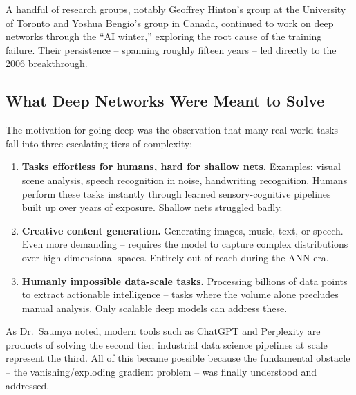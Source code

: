 \documentclass[12pt,a4paper]{article}
\begin{document}
\begin{keyinsight}
A handful of research groups, notably Geoffrey Hinton's group at the
University of Toronto and Yoshua Bengio's group in Canada, continued to
work on deep networks through the ``AI winter,'' exploring the root
cause of the training failure.  Their persistence -- spanning roughly
fifteen years -- led directly to the 2006 breakthrough.
\end{keyinsight}

\subsection{What Deep Networks Were Meant to Solve}
\label{subsec:capabilities}

The motivation for going deep was the observation that many real-world
tasks fall into three escalating tiers of complexity:

\begin{enumerate}
  \item \textbf{Tasks effortless for humans, hard for shallow nets.}
        Examples: visual scene analysis, speech recognition in noise,
        handwriting recognition.  Humans perform these tasks instantly
        through learned sensory-cognitive pipelines built up over years
        of exposure.  Shallow nets struggled badly.

  \item \textbf{Creative content generation.}  Generating images,
        music, text, or speech.  Even more demanding -- requires the
        model to capture complex distributions over high-dimensional
        spaces.  Entirely out of reach during the ANN era.

  \item \textbf{Humanly impossible data-scale tasks.}  Processing
        billions of data points to extract actionable intelligence --
        tasks where the volume alone precludes manual analysis.  Only
        scalable deep models can address these.
\end{enumerate}

As Dr.\ Saumya noted, modern tools such as ChatGPT and Perplexity are
products of solving the second tier; industrial data science pipelines
at scale represent the third.  All of this became possible because the
fundamental obstacle -- the vanishing/exploding gradient problem -- was
finally understood and addressed.

\end{document}
